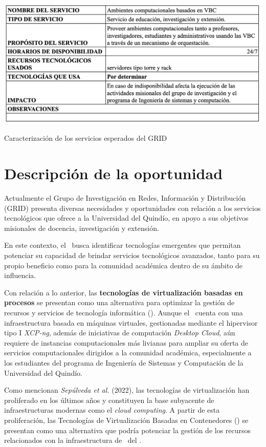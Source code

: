 \begin{table}[H]
    \centering
    \includegraphics[width=\textwidth] {tablas-images/cp1/servicios-esperados/servicios-esperados.png}
    \caption{Caracterización de los servicios esperados del GRID}\label{tab:servicios-esperados}
\end{table}

\section{Descripción de la oportunidad}

Actualmente el Grupo de Investigación en Redes, Información y Distribución (GRID) presenta diversas necesidades y oportunidades con relación a los servicios tecnológicos que ofrece a la Universidad del Quindío, en apoyo a sus objetivos misionales de docencia, investigación y extensión.

En este contexto, el \GRID\ busca identificar tecnologías emergentes que permitan potenciar su capacidad de brindar servicios tecnológicos avanzados, tanto para su propio beneficio como para la comunidad académica dentro de su ámbito de influencia.

Con relación a lo anterior, las \textbf{tecnologías de virtualización basadas en procesos} se presentan como una alternativa para optimizar la gestión de recursos y servicios de tecnología informática (\TI). Aunque el \GRID\ cuenta con una infraestructura basada en máquinas virtuales, gestionadas mediante el hipervisor tipo I \textit{XCP-ng}, además de iniciativas de computación \textit{Desktop Cloud}, aún requiere de instancias computacionales más livianas para ampliar su oferta de servicios computacionales dirigidos a la comunidad académica, especialmente a los estudiantes del programa de Ingeniería de Sistemas y Computación de la Universidad del Quindío.

Como mencionan \textit{Sepúlveda et al.} (2022), las tecnologías de virtualización han proliferado en los últimos años y constituyen la base subyacente de infraestructuras modernas como el \textit{cloud computing}. A partir de esta proliferación, las Tecnologías de Virtualización Basadas en Contenedores (\VBC) se presentan como una alternativa que podría potenciar la gestión de los recursos relacionados con la infraestructura de \TI\ del \GRID.

